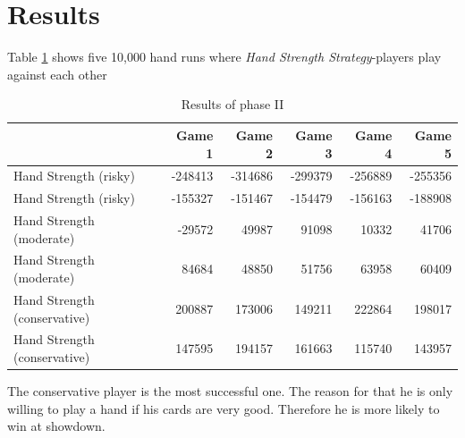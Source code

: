 \section{Results}
Table \ref{tbl:resultsPhase2a} shows five 10,000 hand runs where \emph{Hand Strength Strategy}-players play against each other
\begin{table}[h]
	\centering
	\begin{tabular}[h]{l|r|r|r|r|r}
		& \textbf{Game 1} & \textbf{Game 2} & \textbf{Game 3} & \textbf{Game 4} & \textbf{Game 5}\\
		\hline
		Hand Strength (risky) & -248413 & -314686 & -299379 & -256889 & -255356\\
		Hand Strength (risky) & -155327 & -151467 & -154479 & -156163 & -188908\\
		Hand Strength (moderate) & -29572 & 49987 & 91098 & 10332 & 41706\\
		Hand Strength (moderate) & 84684 & 48850 & 51756 & 63958 & 60409\\
		Hand Strength (conservative) & 200887 & 173006 & 149211 & 222864 & 198017\\
		Hand Strength (conservative) & 147595 & 194157 & 161663 & 115740 & 143957\\
	\end{tabular}
	\label{tbl:resultsPhase2a}
	\caption{Results of phase II}
\end{table}
The conservative player is the most successful one. The reason for that he is only willing to play  a hand if his cards are very good. Therefore he is more likely to win at showdown.

